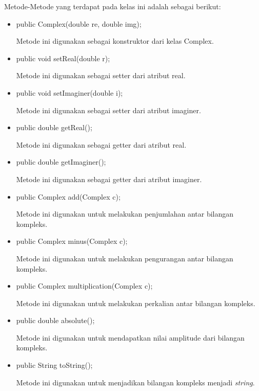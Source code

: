 Metode-Metode yang terdapat pada kelas ini adalah sebagai berikut:
\begin{itemize}
    \item public Complex(double re, double img);
    
    Metode ini digunakan sebagai konstruktor dari kelas Complex.
    
    \item public void setReal(double r);
    
    Metode ini digunakan sebagai setter dari atribut real.
    
    \item public void setImaginer(double i);
    
    Metode ini digunakan sebagai setter dari atribut imaginer.
    
    \item public double getReal();
    
    Metode ini digunakan sebagai getter dari atribut real.
    
    \item public double getImaginer();
    
    Metode ini digunakan sebagai getter dari atribut imaginer.
    
    \item public Complex add(Complex c);
    
    Metode ini digunakan untuk melakukan penjumlahan antar bilangan kompleks.
    
    \item public Complex minus(Complex c);
    
    Metode ini digunakan untuk melakukan pengurangan antar bilangan kompleks.
    
    \item public Complex multiplication(Complex c);
    
    Metode ini digunakan untuk melakukan perkalian antar bilangan kompleks.
    
    \item public double absolute();
    
    Metode ini digunakan untuk mendapatkan nilai amplitude dari bilangan kompleks.
    
    \item public String toString();
    
    Metode ini digunakan untuk menjadikan bilangan kompleks menjadi \textit{string}.
    
\end{itemize}


